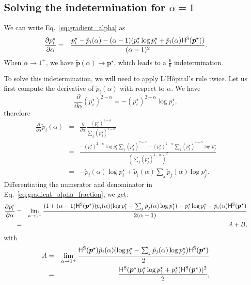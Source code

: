 \documentclass[11pt,a4paper]{article}
\newcommand{\HHs}{\mathsf{H}^\textsc{S}}
\begin{document}
\subsection{Solving the indetermination for $\alpha=1$}

We can write Eq.~\ref{eq:gradient_alpha} as
\begin{eqnarray}\label{eq:gradient_alpha_fraction}
    \frac{\partial p_i^{\star}}{\partial \alpha} &=&
    \frac{p_i^{\star} - \tilde{p}_i(\alpha) - (\alpha-1)(p_i^{\star}\log p_i^{\star} + \tilde{p}_i(\alpha)\HHs(\bm{p}^{\star}))}{(\alpha-1)^2}.
\end{eqnarray}
When $\alpha \rightarrow 1^+$, we have $\tilde{\bm{p}}(\alpha) \rightarrow \bm{p}^{\star}$, which leads to a $\frac{0}{0}$ indetermination.

To solve this indetermination, we will need to apply L'H\^opital's rule twice.
Let us first compute the derivative of $\tilde{p}_i(\alpha)$ with respect to $\alpha$. We have
\begin{equation}
\frac{\partial}{\partial \alpha} (p_i^\star)^{2-\alpha} = -(p_i^{\star})^{2-\alpha} \log p_i^{\star},
\end{equation}
therefore
\begin{eqnarray}
\frac{\partial}{\partial \alpha} \tilde{p}_i(\alpha) &=& \frac{\partial}{\partial \alpha} \frac{(p_i^\star)^{2-\alpha}}{\sum_j (p_j^\star)^{2-\alpha}}\nonumber\\
&=& \frac{-(p_i^{\star})^{2-\alpha} \log p_i^{\star} \sum_j (p_j^\star)^{2-\alpha} + (p_i^{\star})^{2-\alpha} \sum_j (p_j^{\star})^{2-\alpha} \log p_j^{\star}}{\left( \sum_j (p_j^\star)^{2-\alpha} \right)^2}\nonumber\\
&=& -\tilde{p}_i(\alpha)\log p_i^{\star} + \tilde{p}_i(\alpha) \sum_j \tilde{p}_j(\alpha) \log p_j^{\star}.
\end{eqnarray}
Differentiating the numerator and denominator in Eq.~\ref{eq:gradient_alpha_fraction}, we get:
\begin{eqnarray}\label{eq:gradient_alpha_shannon_01}
    \frac{\partial p_i^{\star}}{\partial \alpha} &=&
    \lim_{\alpha \rightarrow 1^+} \frac{(1 + (\alpha-1)\HHs(\bm{p}^{\star})) \tilde{p}_i(\alpha) (\log p_i^{\star} - \sum_j \tilde{p}_j(\alpha) \log p_j^{\star}) - p_i^{\star}\log p_i^{\star} - \tilde{p}_i(\alpha) \HHs(\bm{p}^{\star})}{2(\alpha-1)} \nonumber\\
    &=& A + B,
\end{eqnarray}
with
\begin{eqnarray}\label{eq:A_shannon}
A &=& \lim_{\alpha \rightarrow 1^+} \frac{\HHs(\bm{p}^{\star}) \tilde{p}_i(\alpha) (\log p_i^{\star} - \sum_j \tilde{p}_j(\alpha) \log p_j^{\star}) \HHs(\bm{p}^{\star})}{2}\nonumber\\
&=& \frac{\HHs(\bm{p}^{\star}) p_i^{\star}\log p_i^{\star} + p_i^{\star} (\HHs(\bm{p}^{\star}))^2}{2},
\end{eqnarray}
\end{document}
